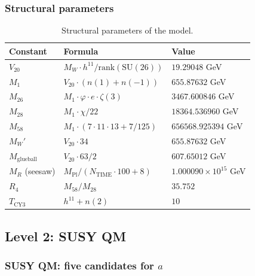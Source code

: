 \documentclass[11pt,a4paper]{article}
\newcommand{\SU}{\ensuremath{\mathrm{SU}}}
\theoremstyle{definition}
\begin{document}
\subsubsection{Structural parameters}

\begin{table}[ht]
\centering
\caption{Structural parameters of the model.}
\label{tab:app-structural}
\begin{tabular}{lll}
\toprule
Constant & Formula & Value \\
\midrule
$V_{20}$ & $M_W \cdot h^{11}/\text{rank}(\SU(26))$ & $19.29048$ GeV \\
$M_1$ & $V_{20} \cdot (n(1) + n(-1))$ & $655.87632$ GeV \\
$M_{26}$ & $M_1 \cdot \varphi \cdot e \cdot \zeta(3)$ & $3467.600846$ GeV \\
$M_{28}$ & $M_1 \cdot \chi/22$ & $18364.536960$ GeV \\
$M_{58}$ & $M_1 \cdot (7 \cdot 11 \cdot 13 + 7/125)$ & $656568.925394$ GeV \\
$M_W'$ & $V_{20} \cdot 34$ & $655.87632$ GeV \\
$M_{\text{glueball}}$ & $V_{20} \cdot 63/2$ & $607.65012$ GeV \\
$M_R$ (seesaw) & $M_{\text{Pl}}/(N_{\text{TIME}} \cdot 100 + 8)$ & $1.000090 \times 10^{15}$ GeV \\
$R_4$ & $M_{58}/M_{28}$ & $35.752$ \\
$T_{\text{CY3}}$ & $h^{11} + n(2)$ & $10$ \\
\bottomrule
\end{tabular}
\end{table}

\subsection{Level 2: SUSY QM}
\label{app:level-2-susy}

\subsubsection{SUSY QM: five candidates for \texorpdfstring{$a$}{a}}
\end{document}
